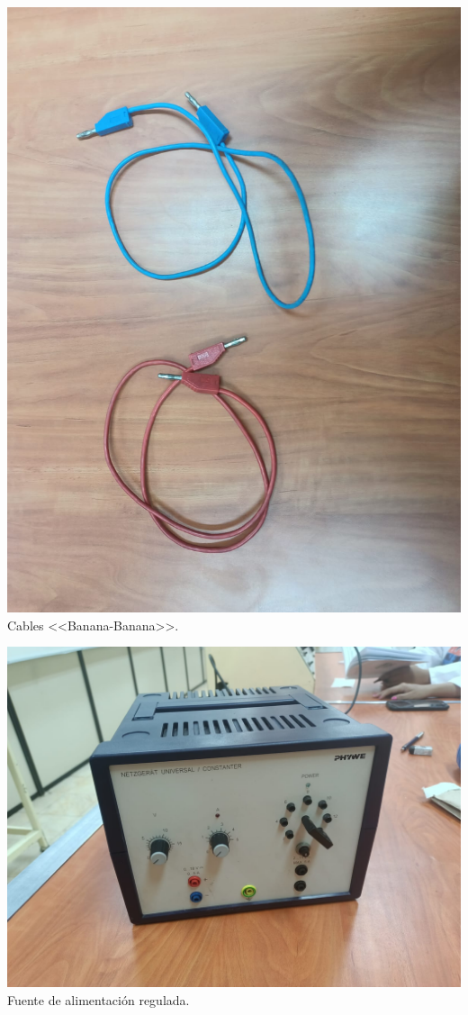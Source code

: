 \documentclass[10pt]{article}
\begin{document}
\begin{multicols}{2}
\begin{center}
	\includegraphics[scale = 0.1]{Imagenes/Material/banban.jpeg}\\
	Cables <<Banana-Banana>>.

	\includegraphics[scale = 0.1]{Imagenes/Material/FuenteVariable.jpeg}\\
	Fuente de alimentación regulada.


\end{center}
\end{multicols}
\end{document}
